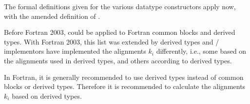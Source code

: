 The formal definitions given for the various datatype constructors
apply now, with the amended definition of .

\begin{rationale}
Before Fortran 2003,  could be applied to Fortran common blocks and
 derived types. With Fortran 2003, this list was extended by  derived types
and \MPI/ implementors have implemented the alignments $k_i$ differently, i.e., some based on
the alignments used in  derived types, and others according to  derived types.
\end{rationale}

\begin{implementors}
In Fortran, it is generally recommended to use  derived types instead of
common blocks or  derived types. Therefore it is recommended to calculate the
alignments $k_i$ based on  derived types.
\end{implementors}

